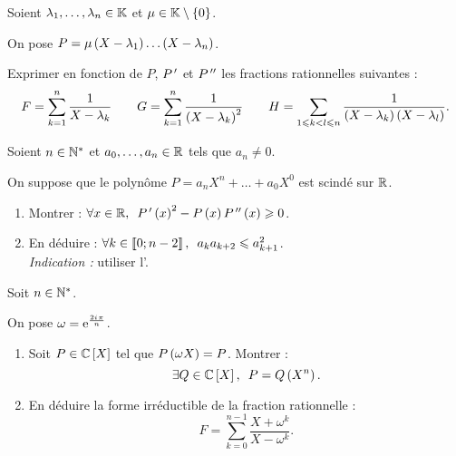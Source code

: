 \begin{corr}
\end{corr}

\begin{exo}[Exercice 23]
Soient \(\lambda_1,\dots,\lambda_n\in\mathbb{K}\) et \(\mu\in\mathbb{K}\setminus\left\lbrace0\right\rbrace\).

On pose \(P=\mu\left(X-\lambda_1\right)\dots\left(X-\lambda_n\right)\).

Exprimer en fonction de \(P\), \(P^{\,\prime}\) et \(P^{\,\prime\prime}\) les fractions rationnelles suivantes : \[F=\sum_{k=1}^n\dfrac{1}{X-\lambda_k}\qquad G=\sum_{k=1}^n\dfrac{1}{\left(X-\lambda_k\right)^2}\qquad H=\sum_{1\leqslant k<l\leqslant n}\dfrac{1}{\left(X-\lambda_k\right)\left(X-\lambda_l\right)}.\]
\end{exo}

\begin{corr}
\end{corr}

\begin{exo}[Exercice 24]
Soient \(n\in\mathbb{N}^*\) et \(a_0,\dots,a_n\in\mathbb{R}\) tels que \(a_n\not=0\).

On suppose que le polynôme \(P=a_nX^n+\dots+a_0X^0\) est scindé sur \(\mathbb{R}\).

\begin{enumerate}
\item Montrer : \(\quantifs{\forall x\in\R}P\prim\paren{x}^2-P\paren{x}P\seconde\paren{x}\geq0\). \\

\item En déduire : \(\quantifs{\forall k\in\interventierii{0}{n-2}}a_ka_{k+2}\leq a_{k+1}^2\). \\

\textit{Indication :} utiliser l'.
\end{enumerate}
\end{exo}

\begin{corr}
\end{corr}

\begin{exo}[Exercice 25]
Soit \(n\in\mathbb{N}^*\).

On pose \(\omega=\mathrm{e}^{\frac{2i\mkern1mu\pi}{n}}\).

\begin{enumerate}
\item Soit \(P\in\poly[\C]\) tel que \(P\left(\omega X\right)=P\). Montrer : \[\quantifs{\exists Q\in\poly[\C]}P=Q\paren{X^n}.\]

\item En déduire la forme irréductible de la fraction rationnelle : \[F=\sum_{k=0}^{n-1}\dfrac{X+\omega^k}{X-\omega^k}.\]
\end{enumerate}
\end{exo}

